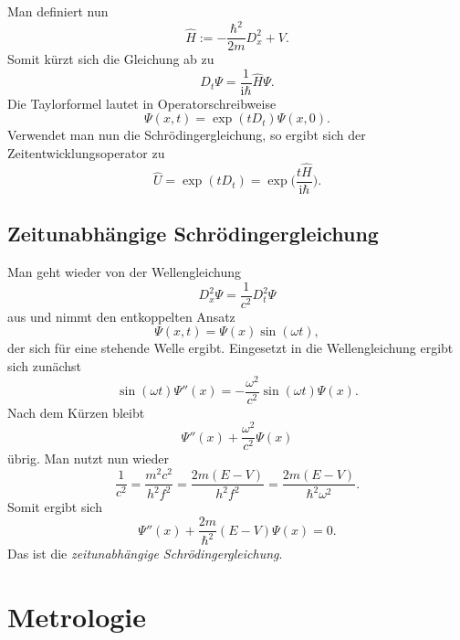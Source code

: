 \documentclass[a4paper,11pt,fleqn,twocolumn,twoside,dvipdfmx]{scrartcl}
\numberwithin{equation}{section}
\newcommand{\ui}{\mathrm i}
\begin{document}
Man definiert nun
\begin{equation}
\hat H := -\frac{\hbar^2}{2m}D_x^2+V.
\end{equation}
Somit kürzt sich die Gleichung ab zu
\begin{equation}
D_t\Psi = \frac{1}{\ui\hbar}\hat H\Psi.
\end{equation}
Die Taylorformel lautet in Operatorschreibweise
\begin{equation}
\Psi(x,t)=\exp(tD_t)\Psi(x,0).
\end{equation}
Verwendet man nun die Schrödingergleichung, so ergibt sich
der Zeitentwicklungsoperator zu
\begin{equation}
\hat U = \exp(tD_t) = \exp\Big(\frac{t\hat H}{\ui\hbar}\Big).
\end{equation}

\subsection[Zeitunabhängige Schrödingergleichung]
{Zeitunabhängige\newline
Schrödingergleichung}

Man geht wieder von der Wellengleichung
\begin{equation}
D_x^2\Psi=\frac{1}{c^2}D_t^2\Psi
\end{equation}
aus und nimmt den entkoppelten Ansatz
\begin{equation}
\Psi(x,t)=\Psi(x)\sin(\omega t),
\end{equation}
der sich für eine stehende Welle ergibt. Eingesetzt in
die Wellengleichung ergibt sich zunächst
\begin{equation}
\sin(\omega t)\Psi''(x)=-\frac{\omega^2}{c^2}\sin(\omega t)\Psi(x).
\end{equation}
Nach dem Kürzen bleibt
\begin{equation}
\Psi''(x) + \frac{\omega^2}{c^2}\Psi(x)
\end{equation}
übrig. Man nutzt nun wieder
\begin{equation}
\frac{1}{c^2} = \frac{m^2 c^2}{h^2 f^2}
= \frac{2m(E-V)}{h^2 f^2}
= \frac{2m(E-V)}{\hbar^2 \omega^2}.
\end{equation}
Somit ergibt sich
\begin{equation}
\Psi''(x) + \frac{2m}{\hbar^2}(E-V)\Psi(x) = 0.
\end{equation}
Das ist die \emph{zeitunabhängige Schrödingergleichung}.

\newpage
\section{Metrologie}
\end{document}

